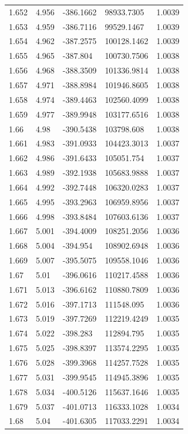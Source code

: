 \begin{tabular}{lllll}
1.652 & 4.956 & -386.1662 & 98933.7305 & 1.0039 \\
1.653 & 4.959 & -386.7116 & 99529.1467 & 1.0039 \\
1.654 & 4.962 & -387.2575 & 100128.1462 & 1.0039 \\
1.655 & 4.965 & -387.804 & 100730.7506 & 1.0038 \\
1.656 & 4.968 & -388.3509 & 101336.9814 & 1.0038 \\
1.657 & 4.971 & -388.8984 & 101946.8605 & 1.0038 \\
1.658 & 4.974 & -389.4463 & 102560.4099 & 1.0038 \\
1.659 & 4.977 & -389.9948 & 103177.6516 & 1.0038 \\
1.66 & 4.98 & -390.5438 & 103798.608 & 1.0038 \\
1.661 & 4.983 & -391.0933 & 104423.3013 & 1.0037 \\
1.662 & 4.986 & -391.6433 & 105051.754 & 1.0037 \\
1.663 & 4.989 & -392.1938 & 105683.9888 & 1.0037 \\
1.664 & 4.992 & -392.7448 & 106320.0283 & 1.0037 \\
1.665 & 4.995 & -393.2963 & 106959.8956 & 1.0037 \\
1.666 & 4.998 & -393.8484 & 107603.6136 & 1.0037 \\
1.667 & 5.001 & -394.4009 & 108251.2056 & 1.0036 \\
1.668 & 5.004 & -394.954 & 108902.6948 & 1.0036 \\
1.669 & 5.007 & -395.5075 & 109558.1046 & 1.0036 \\
1.67 & 5.01 & -396.0616 & 110217.4588 & 1.0036 \\
1.671 & 5.013 & -396.6162 & 110880.7809 & 1.0036 \\
1.672 & 5.016 & -397.1713 & 111548.095 & 1.0036 \\
1.673 & 5.019 & -397.7269 & 112219.4249 & 1.0035 \\
1.674 & 5.022 & -398.283 & 112894.795 & 1.0035 \\
1.675 & 5.025 & -398.8397 & 113574.2295 & 1.0035 \\
1.676 & 5.028 & -399.3968 & 114257.7528 & 1.0035 \\
1.677 & 5.031 & -399.9545 & 114945.3896 & 1.0035 \\
1.678 & 5.034 & -400.5126 & 115637.1646 & 1.0035 \\
1.679 & 5.037 & -401.0713 & 116333.1028 & 1.0034 \\
1.68 & 5.04 & -401.6305 & 117033.2291 & 1.0034 \\

\end{tabular}
